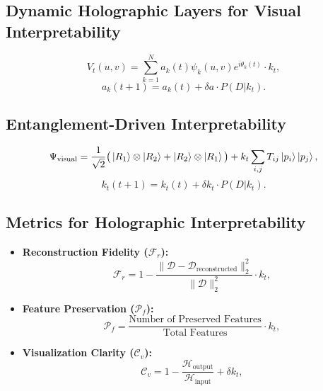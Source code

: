 \documentclass{article}
\theoremstyle{plain}
\begin{document}
\subsection{Dynamic Holographic Layers for Visual Interpretability}
\begin{equation}
V_t(u, v) = \sum_{k=1}^{N} a_k(t) \psi_k(u, v) e^{i\theta_k(t)} \cdot k_t,
\end{equation}
\begin{equation}
a_k(t+1) = a_k(t) + \delta a \cdot P(D | k_t).
\end{equation}

\subsection{Entanglement-Driven Interpretability}
\begin{equation}
\Psi_\text{visual} = \frac{1}{\sqrt{2}} \big(\ket{R_1} \otimes \ket{R_2} + \ket{R_2} \otimes \ket{R_1} \big) + k_t \sum_{i,j} T_{ij} \ket{p_i} \ket{p_j},
\end{equation}
\begin{equation}
k_t(t+1) = k_t(t) + \delta k_t \cdot P(D | k_t).
\end{equation}

\subsection{Metrics for Holographic Interpretability}
\begin{itemize}
    \item \textbf{Reconstruction Fidelity (\( \mathcal{F}_r \)):}
    \begin{equation}
    \mathcal{F}_r = 1 - \frac{\| \mathcal{D} - \mathcal{D}_\text{reconstructed} \|_2^2}{\| \mathcal{D} \|_2^2} \cdot k_t,
    \end{equation}
    \item \textbf{Feature Preservation (\( \mathcal{P}_f \)):}
    \begin{equation}
    \mathcal{P}_f = \frac{\text{Number of Preserved Features}}{\text{Total Features}} \cdot k_t,
    \end{equation}
    \item \textbf{Visualization Clarity (\( \mathcal{C}_v \)):}
    \begin{equation}
    \mathcal{C}_v = 1 - \frac{\mathcal{H}_\text{output}}{\mathcal{H}_\text{input}} + \delta k_t,
    \end{equation}
\end{itemize}
\end{document}
